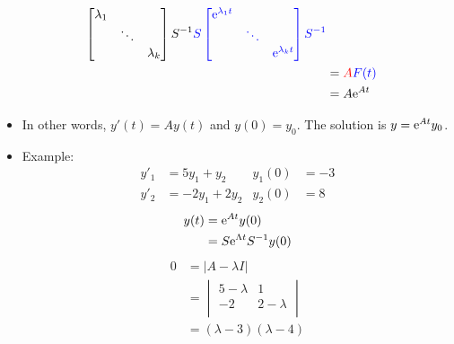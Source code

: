 \documentclass{article}
\begin{document}
\begin{itemize}
\begin{align*}
{\begin{bmatrix}
            \lambda_1 &  & \\
             & \ddots & \\
             &  & \lambda_k\\
        \end{bmatrix}
        S^{-1}}{\color{blue}S
        \begin{bmatrix}
            \text{e}^{\lambda_1t} &  & \\
             & \ddots & \\
             &  & \text{e}^{\lambda_kt}\\
        \end{bmatrix}
        S^{-1}}\\
        &= {\color{red}A}{\color{blue}F(t)}\\
        &= A\text{e}^{At}
    \end{align*}
    \item In other words, $y'(t)=Ay(t)$ and $y(0)=y_0$. The solution is $y=\text{e}^{At}y_0$.
    \item Example:
    \begin{align*}
        y'_1 &= 5y_1+y_2& y_1(0) &= -3\\
        y'_2 &= -2y_1+2y_2& y_2(0) &= 8
    \end{align*}
    \begin{align*}
        y(t) &= \text{e}^{At}y(0)\\
        &= S\text{e}^{\Lambda t}S^{-1}y(0)
    \end{align*}
    \begin{align*}
        0 &= |A-\lambda I|\\
        &=
        \begin{vmatrix}
            5-\lambda & 1\\
            -2 & 2-\lambda\\
        \end{vmatrix}\\
        &= (\lambda-3)(\lambda-4)
    \end{align*}
\end{itemize}
\end{document}
